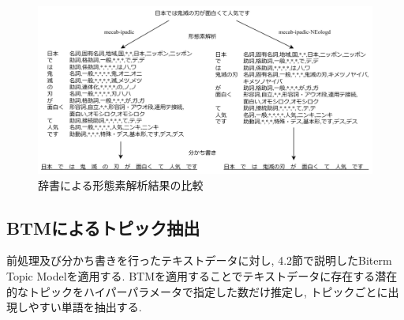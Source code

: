 \documentclass{ltjarticle}
\begin{document}
\begin{figure}[h]
    \centering
    \includegraphics[width = 14.6cm]{images/形態素解析.drawio.png}
    \caption{辞書による形態素解析結果の比較}
    \label{fig:形態素解析}
\end{figure}

\newpage
\subsection{BTMによるトピック抽出}
前処理及び分かち書きを行ったテキストデータに対し, 4.2節で説明したBiterm Topic Modelを適用する. 
BTMを適用することでテキストデータに存在する潜在的なトピックをハイパーパラメータで指定した数だけ推定し, 
トピックごとに出現しやすい単語を抽出する. 

\newpage
\end{document}
